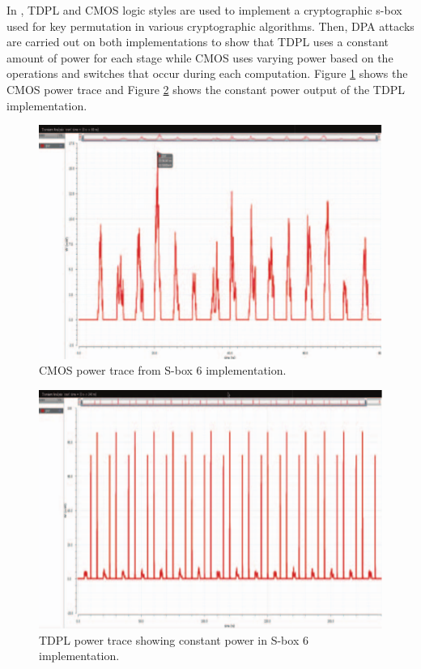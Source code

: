 \documentclass[conference, 12pt]{IEEEtran}
\newcommand{\x}{1}						%
\begin{document}
			In \cite{b1}, TDPL and CMOS logic styles are used to implement a cryptographic s-box used for key permutation in various cryptographic algorithms. Then, DPA attacks are carried out on both implementations to show that TDPL uses a constant amount of power for each stage while CMOS uses varying power based on the operations and switches that occur during each computation. Figure \ref{CMOS_S-box_Power} shows the CMOS power trace and Figure \ref{TDPL_S-box_Power} shows the constant power output of the TDPL implementation.

			\begin{figure}[tbp]
				\centering
				\includegraphics[width=\x\linewidth]{ReportFiles/CMOS_S-box_Power.png}
				\caption{CMOS power trace from S-box 6 implementation.\cite{b1}}
				\label{CMOS_S-box_Power}
			\end{figure}

			\begin{figure}[tbp]
				\centering
				\includegraphics[width=\x\linewidth]{ReportFiles/TDPL_S-box_Power.png}
				\caption{TDPL power trace showing constant power in S-box 6 implementation.\cite{b1}}
				\label{TDPL_S-box_Power}
			\end{figure}
\end{document}

